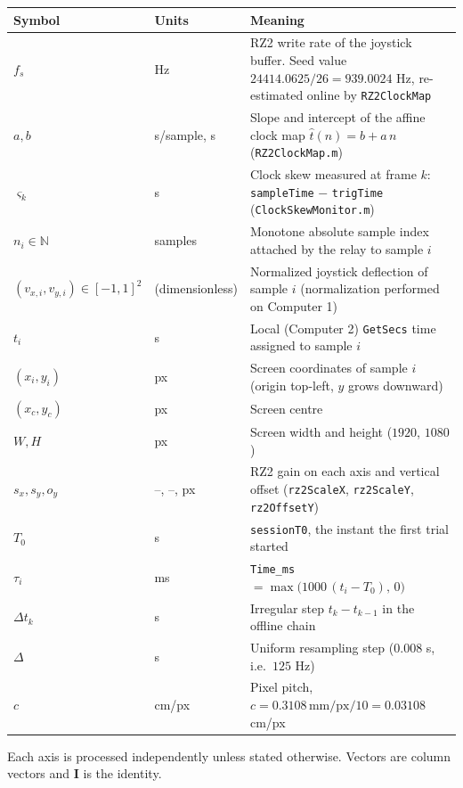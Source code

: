 \documentclass[11pt,a4paper]{article}
\newcommand{\code}[1]{\texttt{\small #1}}
\newcommand{\file}[1]{\texttt{\small #1}}
\begin{document}
\begin{center}
\small
\begin{tabular}{@{}llP{9.4cm}@{}}
\toprule
Symbol & Units & Meaning \\
\midrule
$f_s$ & Hz & RZ2 write rate of the joystick buffer. Seed value
  $24414.0625/26 = 939.0024$ Hz, re-estimated online by \code{RZ2ClockMap} \\
$a, b$ & s/sample, s & Slope and intercept of the affine clock map
  $\hat t(n) = b + a\,n$ (\file{RZ2ClockMap.m}) \\
$\varsigma_k$ & s & Clock skew measured at frame $k$:
  \code{sampleTime} $-$ \code{trigTime} (\file{ClockSkewMonitor.m}) \\
$n_i \in \mathbb{N}$ & samples & Monotone absolute sample index attached by the
  relay to sample $i$ \\
$(v_{x,i}, v_{y,i}) \in [-1,1]^2$ & (dimensionless) & Normalized joystick
  deflection of sample $i$ (normalization performed on Computer 1) \\
$t_i$ & s & Local (Computer 2) \code{GetSecs} time assigned to sample $i$ \\
$(x_i, y_i)$ & px & Screen coordinates of sample $i$ (origin top-left,
  $y$ grows downward) \\
$(x_c, y_c)$ & px & Screen centre \\
$W, H$ & px & Screen width and height ($1920$, $1080$) \\
$s_x, s_y, o_y$ & --, --, px & RZ2 gain on each axis and vertical offset
  (\code{rz2ScaleX}, \code{rz2ScaleY}, \code{rz2OffsetY}) \\
$T_0$ & s & \code{sessionT0}, the instant the first trial started \\
$\tau_i$ & ms & \code{Time\_ms} $= \max\!\big(1000\,(t_i - T_0),\, 0\big)$ \\
$\Delta t_k$ & s & Irregular step $t_k - t_{k-1}$ in the offline chain \\
$\Delta$ & s & Uniform resampling step ($0.008$ s, i.e.\ $125$ Hz) \\
$c$ & cm/px & Pixel pitch, $c = 0.3108\,\text{mm/px}/10 = 0.03108$ cm/px \\
\bottomrule
\end{tabular}
\end{center}

\noindent
Each axis is processed independently unless stated otherwise. Vectors are column
vectors and $\bm{I}$ is the identity.

\end{document}
